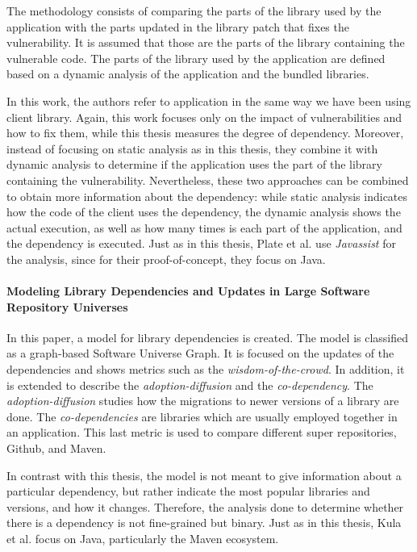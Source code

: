 The methodology consists of comparing the parts of the library used by the application with the parts updated in the library patch that fixes the vulnerability. It is assumed that those are the parts of the library containing the vulnerable code. The parts of the library used by the application are defined based on a dynamic analysis of the application and the bundled libraries.

In this work, the authors refer to application in the same way we have been using client library. Again, this work focuses only on the impact of vulnerabilities and how to fix them, while this thesis measures the degree of dependency. Moreover, instead of focusing on static analysis as in this thesis, they combine it with dynamic analysis to determine if the application uses the part of the library containing the vulnerability. Nevertheless, these two approaches can be combined to obtain more information about the dependency: while static analysis indicates how the code of the client uses the dependency, the dynamic analysis shows the actual execution, as well as how many times is each part of the application, and the dependency is executed. Just as in this thesis, Plate et al. use \textit{Javassist} for the analysis, since for their proof-of-concept, they focus on Java.

\paragraph{Modeling Library Dependencies and Updates in Large Software Repository Universes \cite{Kula2017}}

In this paper, a model for library dependencies is created. The model is classified as a graph-based Software Universe Graph. It is focused on the updates of the dependencies and shows metrics such as the \textit{wisdom-of-the-crowd}. In addition, it is extended to describe the \textit{adoption-diffusion} and the \textit{co-dependency}. The \textit{adoption-diffusion} studies how the migrations to newer versions of a library are done. The \textit{co-dependencies} are libraries which are usually employed together in an application. This last metric is used to compare different super repositories, Github, and Maven.

In contrast with this thesis, the model is not meant to give information about a particular dependency, but rather indicate the most popular libraries and versions, and how it changes. Therefore, the analysis done to determine whether there is a dependency is not fine-grained but binary. Just as in this thesis, Kula et al. focus on Java, particularly the Maven ecosystem.


